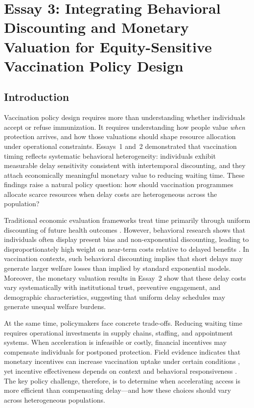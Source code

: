 \documentclass[doublespacing]{utdthesis}
\let\cite=\citep
\begin{document}
\chapter{Essay 3: Integrating Behavioral Discounting and Monetary Valuation for Equity-Sensitive Vaccination Policy Design}
\label{sec:essay3}

\section{Introduction}
\vspace*{-\baselineskip}
\noindent
Vaccination policy design requires more than understanding whether individuals accept or refuse immunization. It requires understanding how people value \emph{when} protection arrives, and how those valuations should shape resource allocation under operational constraints. Essays~1 and~2 demonstrated that vaccination timing reflects systematic behavioral heterogeneity: individuals exhibit measurable delay sensitivity consistent with intertemporal discounting, and they attach economically meaningful monetary value to reducing waiting time. These findings raise a natural policy question: how should vaccination programmes allocate scarce resources when delay costs are heterogeneous across the population?

Traditional economic evaluation frameworks treat time primarily through uniform discounting of future health outcomes \cite{Drummond2015}. However, behavioral research shows that individuals often display present bias and non-exponential discounting, leading to disproportionately high weight on near-term costs relative to delayed benefits \cite{Laibson1997,ODonoghueRabin2001}. In vaccination contexts, such behavioral discounting implies that short delays may generate larger welfare losses than implied by standard exponential models. Moreover, the monetary valuation results in Essay~2 show that these delay costs vary systematically with institutional trust, preventive engagement, and demographic characteristics, suggesting that uniform delay schedules may generate unequal welfare burdens.

At the same time, policymakers face concrete trade-offs. Reducing waiting time requires operational investments in supply chains, staffing, and appointment systems. When acceleration is infeasible or costly, financial incentives may compensate individuals for postponed protection. Field evidence indicates that monetary incentives can increase vaccination uptake under certain conditions \cite{CamposMercade2021,Thirumurthy2022}, yet incentive effectiveness depends on context and behavioral responsiveness \cite{Gneezy2011}. The key policy challenge, therefore, is to determine when accelerating access is more efficient than compensating delay—and how these choices should vary across heterogeneous populations.
\end{document}
